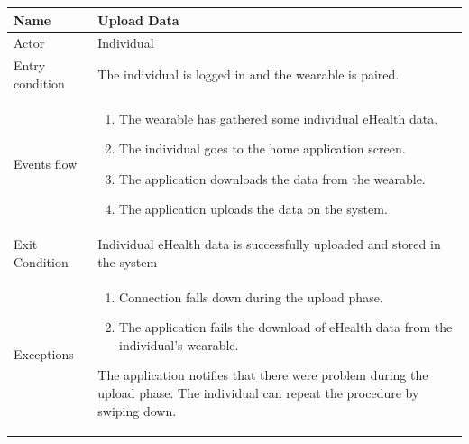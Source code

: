 \begin{table}[p]
\centering
\begin{tabular}{|l|p{11cm}|}
    \hline
    Name & Upload Data
    \\ \hline
    Actor & Individual
    \\ \hline 
    Entry condition & The individual is logged in and the wearable is paired.
    \\ \hline
    Events flow &
    \begin{enumerate}
    \item The wearable has gathered some individual eHealth data.
    \item The individual goes to the home application screen.
    \item The application downloads the data from the wearable.
    \item The application uploads the data on the system.
    \end{enumerate}
     \\ \hline
     Exit Condition & Individual eHealth data is successfully uploaded and stored in the system
     \\
    \hline
    Exceptions &
    \begin{enumerate}
    \item Connection falls down during the upload phase.
    \item The application fails the download of eHealth data from the individual's wearable. 
    \end{enumerate}
  The application notifies that there were problem during the upload phase. The individual can repeat the procedure by swiping down.
      \\
    \hline
\end{tabular}
\end{table}


